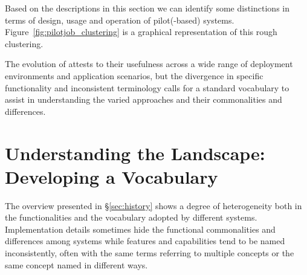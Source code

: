 \documentclass{sig-alternate}
\begin{document}

Based on the descriptions in this section we can identify some distinctions in
terms of design, usage and operation of pilot(-based) systems.
Figure~\ref{fig:pilotjob_clustering} is a graphical representation of this
rough clustering.

The evolution of \pilotjobs attests to their usefulness across a wide range of
deployment environments and application scenarios, but the divergence in
specific functionality and inconsistent terminology calls for a standard
vocabulary to assist in understanding the varied approaches and their
commonalities and differences.





\section{Understanding the Landscape: Developing a Vocabulary}
\label{sec:3}

The overview presented in \S\ref{sec:history} shows a degree of
heterogeneity both in the functionalities and the vocabulary adopted by
different \pilot systems. Implementation details sometimes hide the
functional commonalities and differences among \pilot systems while
features and capabilities tend to be named inconsistently, often with
the same terms referring to multiple concepts or the same concept named
in different ways.
\end{document}
